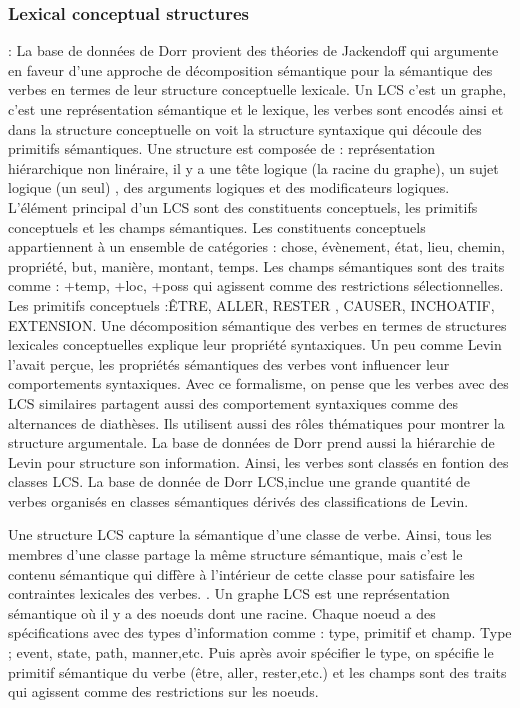 \subsubsection{Lexical conceptual structures} : La base de données de Dorr provient des théories de Jackendoff qui argumente en faveur d'une approche de décomposition sémantique pour la sémantique des verbes en termes de leur structure conceptuelle lexicale\citep{DorrUseLexicalSemantics1992}. Un LCS c'est un graphe, c'est une représentation sémantique et le lexique, les verbes sont encodés ainsi et dans la structure conceptuelle on voit la structure syntaxique qui découle des primitifs sémantiques. Une structure est composée de : représentation hiérarchique non linéraire, il y a une tête logique (la racine du graphe), un sujet logique (un seul) , des arguments logiques et des modificateurs logiques. L'élément principal d'un LCS sont des constituents conceptuels, les primitifs conceptuels et les champs sémantiques. Les constituents conceptuels appartiennent à un ensemble de catégories : chose, évènement, état, lieu, chemin, propriété, but, manière, montant, temps. Les champs sémantiques sont des traits comme : +temp, +loc, +poss qui agissent comme des restrictions sélectionnelles. Les primitifs conceptuels :ÊTRE, ALLER, RESTER , CAUSER, INCHOATIF, EXTENSION. Une décomposition sémantique des verbes en termes de structures lexicales conceptuelles explique leur propriété syntaxiques. Un peu comme Levin l'avait perçue, les propriétés sémantiques des verbes vont influencer leur comportements syntaxiques. Avec ce formalisme, on pense que les verbes avec des LCS similaires partagent aussi des comportement syntaxiques comme des alternances de diathèses. Ils utilisent aussi des rôles thématiques pour montrer la structure argumentale. La base de données de Dorr prend aussi la hiérarchie de Levin pour structure son information. Ainsi, les verbes sont classés en fontion des classes LCS. La base de donnée de Dorr LCS,inclue une grande quantité de verbes organisés en classes sémantiques dérivés des classifications de Levin.

Une structure LCS capture la sémantique d'une classe de verbe. Ainsi, tous les membres d'une classe partage la même structure sémantique, mais c'est le contenu sémantique qui diffère à l'intérieur de cette classe pour satisfaire les contraintes lexicales des verbes. \citep{TraumGenerationLexicalConceptual2000}. Un graphe LCS est une représentation sémantique où il y a des noeuds dont une racine. Chaque noeud a des spécifications avec des types d'information comme : type, primitif et champ. Type ; event, state, path, manner,etc. Puis après avoir spécifier le type, on spécifie le primitif sémantique du verbe (être, aller, rester,etc.)  et les champs sont des traits qui agissent comme des restrictions sur les noeuds.

